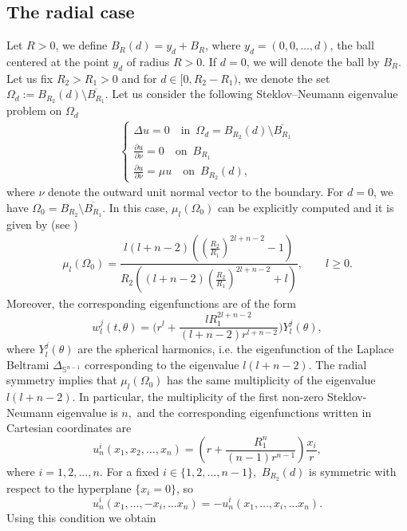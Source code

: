 \documentclass[12pt,reqno]{amsart}
\numberwithin{equation}{section}
\numberwithin{theorem}{section}
\numberwithin{equation}{section}
\numberwithin{theorem}{section}
\begin{document}
\subsection{The radial case}\label{subsec:radial}
 Let $R>0$,  we define $B_{R}(d) = y_d + B_{R}$, where $y_d = (0, 0, \dots, d)$, the ball centered at the point $y_d$ of radius $R>0$. If $d=0$, we will denote the ball by $B_R$. Let us fix $R_2>R_1>0$ and for $d \in [0, R_2 - R_1)$, we denote the set $\Omega_d := B_{R_2}(d) \setminus \overline{B_{R_1}}$. Let us consider the following Steklov--Neumann eigenvalue problem on  $\Omega_d$ 
\begin{align*}
        \begin{cases}
            \Delta u =0 \quad \text{in} \,\,\,\Omega_d=B_{R_2}(d) \setminus \overline{B_{R_1}}\\
            \frac{\partial u}{\partial \nu}=0 \quad \text{on}\,\,\, B_{R_1}\\
            \frac{\partial u}{\partial \nu}= \mu u \quad \text{on} \,\,\, B_{R_2}(d),
        \end{cases}
\end{align*}
where $\nu$ denote the outward unit normal vector to the boundary. For $d = 0$, we have $\Omega_0 = B_{R_2} \setminus \overline{B_{R_1}}$. In this case, $\mu_l(\Omega_0)$ can be explicitly computed and it is given by (see \cite{basak2024bounds})
 \begin{align*}
      \mu_l(\Omega_0) = \dfrac{l(l + n - 2)\left( \left( \frac{R_2}{R_1} \right)^{2l + n - 2} - 1 \right)}{R_2 \left( (l + n - 2)\left( \frac{R_2}{R_1} \right)^{2l + n - 2} + l \right)}, \quad  \quad l\geq 0.
 \end{align*}
 Moreover, the corresponding eigenfunctions are of the form
 $$w_l^j(t,\theta)= \bigg(r^l + \dfrac{l R_1^{2l + n - 2}}{(l + n - 2) r^{l + n - 2}}\bigg)Y_l^j(\theta),$$   where $Y_l^j(\theta)$ are the spherical harmonics, i.e. the eigenfunction of the Laplace Beltrami $\Delta_{\mathbb{S}^{n-1}}$ corresponding to the eigenvalue $l(l+n-2)$. The radial symmetry implies that  $\mu_l(\Omega_0)$ has the same multiplicity of the eigenvalue $l(l+n-2)$. In particular, the multiplicity of the first non-zero Steklov-Neumann eigenvalue is $n,$ and the corresponding eigenfunctions written in Cartesian coordinates are 
 \begin{equation*}
    u^i_n(x_1,x_2,\dots, x_n)= \left(r+\frac{R_1^n}{(n-1)r^{n-1}}\right)\frac{x_i}{r},
 \end{equation*}
where $i=1,2,\dots, n.$
For a fixed $i\in \{1,2,\dots,n-1\}, \,\, B_{R_2}(d)$ is symmetric with respect to the hyperplane $\{x_i=0\}$, so $$u_n^i(x_1,\dots,-x_i, \dots x_n)= -u_n^i(x_1,\dots,x_i, \dots x_n).$$ Using this condition we obtain  
\end{document}
